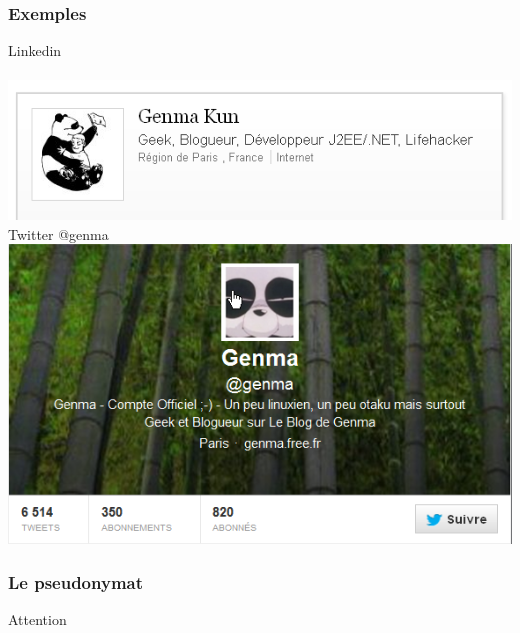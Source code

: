 \documentclass{beamer}
\begin{document}
\begin{frame}
\frametitle{Exemples}
\begin{center}
Linkedin\\~\\
\includegraphics[scale=0.4] {./images/Linkedin.png} 
\\
Twitter @genma\\
\includegraphics[scale=0.4] {./images/Twitter.png}
\end{center}
\end{frame}

\begin{frame}
\frametitle{Le pseudonymat}

\begin{block}{Attention}
\end{block}
\end{frame}
\end{document}
